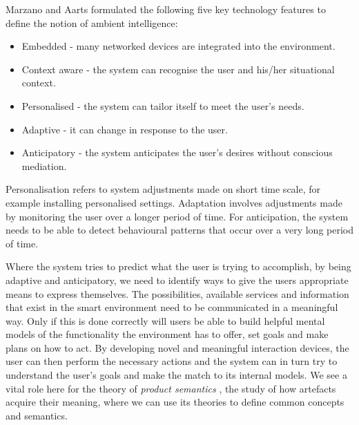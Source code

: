 
Marzano and Aarts \cite{Aarts2004} formulated the following five key technology features to define the notion of ambient intelligence:

\begin{itemize}
\item Embedded - many networked devices are integrated into the environment.
\item Context aware - the system can recognise the user and his/her situational context.
\item Personalised - the system can tailor itself to meet the user's needs.
\item Adaptive - it can change in response to the user.
\item Anticipatory - the system anticipates the user's desires without conscious mediation.
\end{itemize}

Personalisation refers to system adjustments made on short time scale, for example installing personalised settings. Adaptation involves adjustments made by monitoring the user over a longer period of time. For anticipation, the system needs to be able to detect behavioural patterns that occur over a very long period of time.


Where the system tries to predict what the user is trying to accomplish, by being adaptive and anticipatory, we need to identify ways to give the users appropriate means to express themselves. The possibilities, available services and information that exist in the smart environment need to be communicated in a meaningful way. Only if this is done correctly will users be able to build helpful mental models of the functionality the environment has to offer, set goals and make plans on how to act. By developing novel and meaningful interaction devices, the user can then perform the necessary actions and the system can in turn try to understand the user's goals and make the match to its internal models. We see a vital role here for the theory of \emph{product semantics} \cite{Feijs2009}, the study of how artefacts acquire their meaning, where we can use its theories to define common concepts and semantics.

